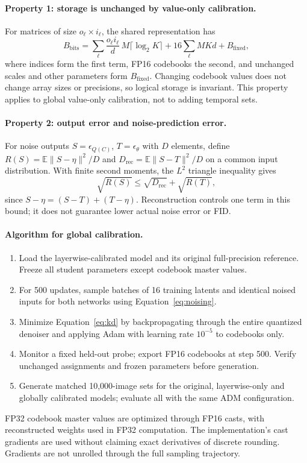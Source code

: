 \documentclass{article}
\begin{document}
\paragraph{Property 1: storage is unchanged by value-only calibration.}
For matrices of size $o_\ell\times i_\ell$, the shared representation has
\begin{equation}
 B_{\mathrm{bits}}=
 \sum_\ell \frac{o_\ell i_\ell}{d}\,M\lceil\log_2K\rceil
 +16\sum_\ell MKd+B_{\mathrm{fixed}},
 \label{eq:storage}
\end{equation}
where indices form the first term, FP16 codebooks the second, and unchanged scales and other parameters form $B_{\mathrm{fixed}}$. Changing codebook values does not change array sizes or precisions, so logical storage is invariant. This property applies to global value-only calibration, not to adding temporal sets.

\paragraph{Property 2: output error and noise-prediction error.}
For noise outputs $S=\epsilon_{Q(C)}$, $T=\epsilon_\theta$ with $D$ elements, define $R(S)=\mathbb E\|S-\eta\|^2/D$ and $D_{\mathrm{rec}}=\mathbb E\|S-T\|^2/D$ on a common input distribution. With finite second moments, the $L^2$ triangle inequality gives
\begin{equation}
 \sqrt{R(S)}\leq\sqrt{D_{\mathrm{rec}}}+\sqrt{R(T)},
 \label{eq:bound}
\end{equation}
since $S-\eta=(S-T)+(T-\eta)$. Reconstruction controls one term in this bound; it does not guarantee lower actual noise error or FID.

\paragraph{Algorithm for global calibration.}
\begin{enumerate}
 \item Load the layerwise-calibrated model and its original full-precision reference. Freeze all student parameters except codebook master values.
 \item For 500 updates, sample batches of 16 training latents and identical noised inputs for both networks using Equation~\eqref{eq:noising}.
 \item Minimize Equation~\eqref{eq:kd} by backpropagating through the entire quantized denoiser and applying Adam with learning rate $10^{-5}$ to codebooks only.
 \item Monitor a fixed held-out probe; export FP16 codebooks at step 500. Verify unchanged assignments and frozen parameters before generation.
 \item Generate matched 10,000-image sets for the original, layerwise-only and globally calibrated models; evaluate all with the same ADM configuration.
\end{enumerate}
FP32 codebook master values are optimized through FP16 casts, with reconstructed weights used in FP32 computation. The implementation's cast gradients are used without claiming exact derivatives of discrete rounding. Gradients are not unrolled through the full sampling trajectory.
\end{document}
